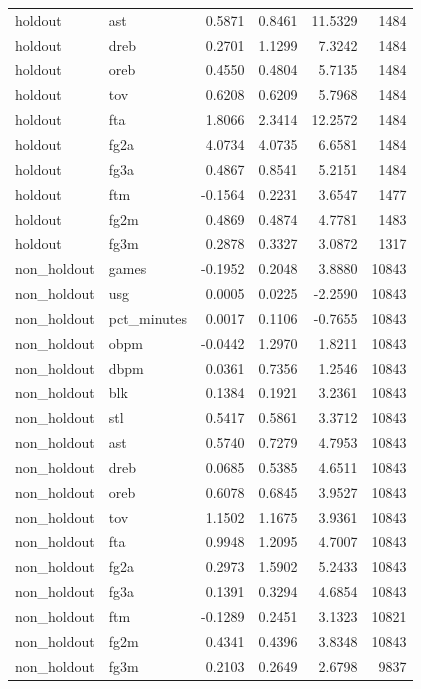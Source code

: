 \begin{table}
\begin{tabular}{llrrrr}
holdout & ast & 0.5871 & 0.8461 & 11.5329 & 1484 \\
holdout & dreb & 0.2701 & 1.1299 & 7.3242 & 1484 \\
holdout & oreb & 0.4550 & 0.4804 & 5.7135 & 1484 \\
holdout & tov & 0.6208 & 0.6209 & 5.7968 & 1484 \\
holdout & fta & 1.8066 & 2.3414 & 12.2572 & 1484 \\
holdout & fg2a & 4.0734 & 4.0735 & 6.6581 & 1484 \\
holdout & fg3a & 0.4867 & 0.8541 & 5.2151 & 1484 \\
holdout & ftm & -0.1564 & 0.2231 & 3.6547 & 1477 \\
holdout & fg2m & 0.4869 & 0.4874 & 4.7781 & 1483 \\
holdout & fg3m & 0.2878 & 0.3327 & 3.0872 & 1317 \\
non\_holdout & games & -0.1952 & 0.2048 & 3.8880 & 10843 \\
non\_holdout & usg & 0.0005 & 0.0225 & -2.2590 & 10843 \\
non\_holdout & pct\_minutes & 0.0017 & 0.1106 & -0.7655 & 10843 \\
non\_holdout & obpm & -0.0442 & 1.2970 & 1.8211 & 10843 \\
non\_holdout & dbpm & 0.0361 & 0.7356 & 1.2546 & 10843 \\
non\_holdout & blk & 0.1384 & 0.1921 & 3.2361 & 10843 \\
non\_holdout & stl & 0.5417 & 0.5861 & 3.3712 & 10843 \\
non\_holdout & ast & 0.5740 & 0.7279 & 4.7953 & 10843 \\
non\_holdout & dreb & 0.0685 & 0.5385 & 4.6511 & 10843 \\
non\_holdout & oreb & 0.6078 & 0.6845 & 3.9527 & 10843 \\
non\_holdout & tov & 1.1502 & 1.1675 & 3.9361 & 10843 \\
non\_holdout & fta & 0.9948 & 1.2095 & 4.7007 & 10843 \\
non\_holdout & fg2a & 0.2973 & 1.5902 & 5.2433 & 10843 \\
non\_holdout & fg3a & 0.1391 & 0.3294 & 4.6854 & 10843 \\
non\_holdout & ftm & -0.1289 & 0.2451 & 3.1323 & 10821 \\
non\_holdout & fg2m & 0.4341 & 0.4396 & 3.8348 & 10843 \\
non\_holdout & fg3m & 0.2103 & 0.2649 & 2.6798 & 9837 \\
\bottomrule
\end{tabular}
\end{table}
